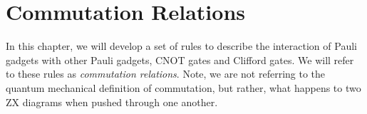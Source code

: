 \chapter{\label{commutation-relations}Commutation Relations}

In this chapter, we will develop a set of rules to describe the interaction of Pauli gadgets with other Pauli gadgets, CNOT gates and Clifford gates. We will refer to these rules as \textit{commutation relations}. Note, we are not referring to the quantum mechanical definition of commutation, but rather, what happens to two ZX diagrams when pushed through one another.

